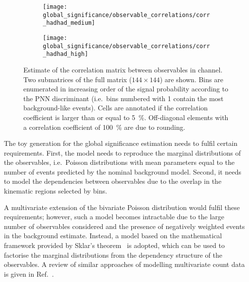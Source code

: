 \begin{figure}[htbp]
  \centering

  \begin{subfigure}{\textwidth}
    \centering

    \texttt{[image: global\_significance/observable\_correlations/corr\_hadhad\_medium]}
    \label{fig:correlation_matrix_observables_medium}
  \end{subfigure}

  \begin{subfigure}{\textwidth}
    \centering

    \texttt{[image: global\_significance/observable\_correlations/corr\_hadhad\_high]}
    \label{fig:correlation_matrix_observables_high}
  \end{subfigure}

  \caption[Estimate of the correlation matrix between observables in the \hadhad
  channel.]{Estimate of the correlation matrix between observables in \hadhad
    channel. Two submatrices of the full matrix ($144 \times 144$) are
    shown. Bins are enumerated in increasing order of the signal probability
    according to the PNN discriminant (i.e.\ bins numbered with 1 contain the
    most background-like events). Cells are annotated if the correlation
    coefficient is larger than or equal to \SI{5}{\percent}. Off-diagonal
    elements with a correlation coefficient of \SI{100}{\percent} are due to
    rounding.}%
  \label{fig:correlation_matrix_observables}
\end{figure}

The toy generation for the global significance estimation needs to fulfil
certain requirements. First, the model needs to reproduce the marginal
distributions of the observables, i.e.\ Poisson distributions with mean
parameters equal to the number of events predicted by the nominal background
model.
Second, it needs to model the dependencies between observables due to the
overlap in the kinematic regions selected by bins.

A multivariate extension of the bivariate Poisson distribution would fulfil
these requirements; however, such a model becomes intractable due to the large
number of observables considered and the presence of negatively weighted events
in the background estimate.
Instead, a model based on the mathematical framework provided by Sklar's
theorem~\cite{Sklar1959FonctionsDR} is adopted, which can be used to factorise
the marginal distributions from the dependency structure of the observables. A
review of similar approaches of modelling multivariate count data is given in
Ref.~\cite{10.1002/wics.1398}.

